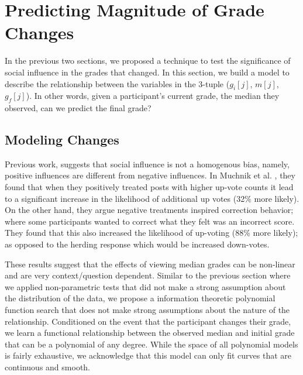 \section{Predicting Magnitude of Grade Changes}
\label{changemod}
In the previous two sections, we proposed a technique to test the significance of social influence in the grades that changed.
In this section, we build a model to describe the relationship between the variables in the 3-tuple ($g_i[j]$, $m[j]$, $g_f[j]$).
In other words, given a participant's current grade, the median they observed, can we predict the final grade?

\subsection{Modeling Changes}
Previous work, suggests that social influence is not a homogenous bias, namely, positive influences are different from negative influences.
In Muchnik et al. \cite{muchnik2013social}, they found that when they positively treated posts with higher up-vote counts it lead to a significant increase in the likelihood of additional up votes (32\% more likely). 
On the other hand, they argue negative treatments inspired correction behavior; where some participants wanted to correct what they felt was an incorrect score. 
They found that this also increased the likelihood of up-voting (88\% more likely); as opposed to the herding response which would be increased down-votes.

These results suggest that the effects of viewing median grades can be non-linear and are very context/question dependent.
Similar to the previous section where we applied non-parametric tests that did not make a strong assumption about the distribution of the data, we propose a information theoretic polynomial function search that does not make strong assumptions about the nature of the relationship.
Conditioned on the event that the participant changes their grade, we learn a functional relationship between the observed median and initial grade that can be a polynomial of any degree.
While the space of all polynomial models is fairly exhaustive, we acknowledge that this model can only fit curves that are continuous and smooth.


